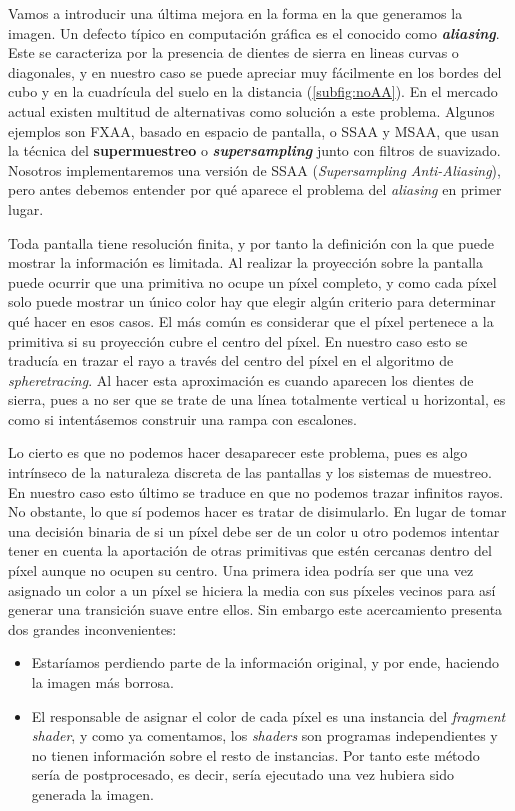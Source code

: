 Vamos a introducir una última mejora en la forma en la que generamos la imagen. Un defecto típico en computación gráfica es el conocido como \textbf{\textit{aliasing}}. Este se caracteriza por la presencia de dientes de sierra en lineas curvas o diagonales, y en nuestro caso se puede apreciar muy fácilmente en los bordes del cubo y en la cuadrícula del suelo en la distancia (\autoref{subfig:noAA}). En el mercado actual existen multitud de alternativas como solución a este problema. Algunos ejemplos son FXAA, basado en espacio de pantalla, o SSAA y MSAA, que usan la técnica del \textbf{supermuestreo} o \textbf{\textit{supersampling}} junto con filtros de suavizado. Nosotros implementaremos una versión de SSAA (\textit{Supersampling Anti-Aliasing}), pero antes debemos entender por qué aparece el problema del \textit{aliasing} en primer lugar. \newline

Toda pantalla tiene resolución finita, y por tanto la definición con la que puede mostrar la información es limitada. Al realizar la proyección sobre la pantalla puede ocurrir que una primitiva no ocupe un píxel completo, y como cada píxel solo puede mostrar un único color hay que elegir algún criterio para determinar qué hacer en esos casos. El más común es considerar que el píxel pertenece a la primitiva si su proyección cubre el centro del píxel. En nuestro caso esto se traducía en trazar el rayo a través del centro del píxel en el algoritmo de \textit{spheretracing}. Al hacer esta aproximación es cuando aparecen los dientes de sierra, pues a no ser que se trate de una línea totalmente vertical u horizontal, es como si intentásemos construir una rampa con escalones.\newline

Lo cierto es que no podemos hacer desaparecer este problema, pues es algo intrínseco de la naturaleza discreta de las pantallas y los sistemas de muestreo. En nuestro caso esto último se traduce en que no podemos trazar infinitos rayos. No obstante, lo que sí podemos hacer es tratar de disimularlo. En lugar de tomar una decisión binaria de si un píxel debe ser de un color u otro podemos intentar tener en cuenta la aportación de otras primitivas que estén cercanas dentro del píxel aunque no ocupen su centro. Una primera idea podría ser que una vez asignado un color a un píxel se hiciera la media con sus píxeles vecinos para así generar una transición suave entre ellos. Sin embargo este acercamiento presenta dos grandes inconvenientes:
\begin{itemize}
    \item Estaríamos perdiendo parte de la información original, y por ende, haciendo la imagen más borrosa.
    \item El responsable de asignar el color de cada píxel es una instancia del \textit{fragment shader}, y como ya comentamos, los \textit{shaders} son programas independientes y no tienen información sobre el resto de instancias. Por tanto este método sería de postprocesado, es decir, sería ejecutado una vez hubiera sido generada la imagen.
    
\end{itemize}

